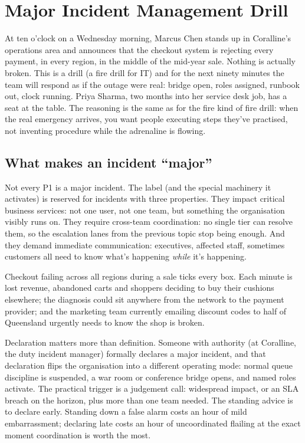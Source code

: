 \section{Major Incident Management Drill}
At ten o'clock on a Wednesday morning, Marcus Chen stands up in Coralline's operations area and announces that the checkout system is rejecting every payment, in every region, in the middle of the mid-year sale. Nothing is actually broken. This is a drill (a fire drill for IT) and for the next ninety minutes the team will respond as if the outage were real: bridge open, roles assigned, runbook out, clock running. Priya Sharma, two months into her service desk job, has a seat at the table. The reasoning is the same as for the fire kind of fire drill: when the real emergency arrives, you want people executing steps they've practised, not inventing procedure while the adrenaline is flowing.



\subsection{What makes an incident ``major''}


Not every P1 is a major incident. The label (and the special machinery it activates) is reserved for incidents with three properties. They impact critical business services: not one user, not one team, but something the organisation visibly runs on. They require cross-team coordination: no single tier can resolve them, so the escalation lanes from the previous topic stop being enough. And they demand immediate communication: executives, affected staff, sometimes customers all need to know what's happening \emph{while} it's happening.


Checkout failing across all regions during a sale ticks every box. Each minute is lost revenue, abandoned carts and shoppers deciding to buy their cushions elsewhere; the diagnosis could sit anywhere from the network to the payment provider; and the marketing team currently emailing discount codes to half of Queensland urgently needs to know the shop is broken.


Declaration matters more than definition. Someone with authority (at Coralline, the duty incident manager) formally declares a major incident, and that declaration flips the organisation into a different operating mode: normal queue discipline is suspended, a war room or conference bridge opens, and named roles activate. The practical trigger is a judgement call: widespread impact, or an SLA breach on the horizon, plus more than one team needed. The standing advice is to declare early. Standing down a false alarm costs an hour of mild embarrassment; declaring late costs an hour of uncoordinated flailing at the exact moment coordination is worth the most.



